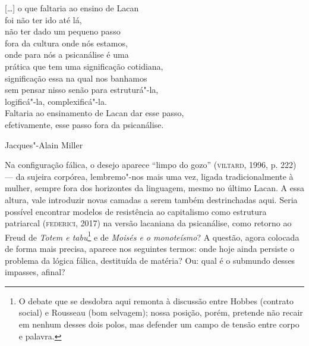 \epigraph{{[}\ldots{}{]} o que faltaria ao ensino de Lacan\\
foi não ter ido até lá,\\
não ter dado um pequeno passo\\
fora da cultura onde nós estamos,\\
onde para nós a psicanálise é uma\\
prática que tem uma significação cotidiana,\\
significação essa na qual nos banhamos\\
sem pensar nisso senão para estruturá"-la,\\
logificá"-la, complexificá"-la.\\
Faltaria ao ensinamento de Lacan dar esse passo,\\
efetivamente, esse passo fora da psicanálise.}{Jacques"-Alain Miller}

Na configuração fálica, o desejo aparece ``limpo do gozo'' (\textsc{viltard},
1996, p. 222) --- da sujeira corpórea, lembremo"-nos mais uma vez, ligada
tradicionalmente à mulher, sempre fora dos horizontes da linguagem,
mesmo no último Lacan. A essa altura, vale introduzir novas camadas a
serem também destrinchadas aqui. Seria possível encontrar modelos de
resistência ao capitalismo como estrutura patriarcal (\textsc{federici},
2017) na versão lacaniana da psicanálise, como retorno ao Freud de
\emph{Totem e tabu}\footnote{O debate que se desdobra aqui remonta à
  discussão entre Hobbes (contrato social) e Rousseau (bom selvagem);
  nossa posição, porém, pretende não recair em nenhum desses dois polos,
  mas defender um campo de tensão entre corpo e palavra.} e de
\emph{Moisés e o monoteísmo}? A questão, agora colocada de forma mais
precisa, aparece nos seguintes termos: onde hoje ainda persiste o
problema da lógica fálica, destituída de matéria? Ou: qual é o submundo
desses impasses, afinal?

